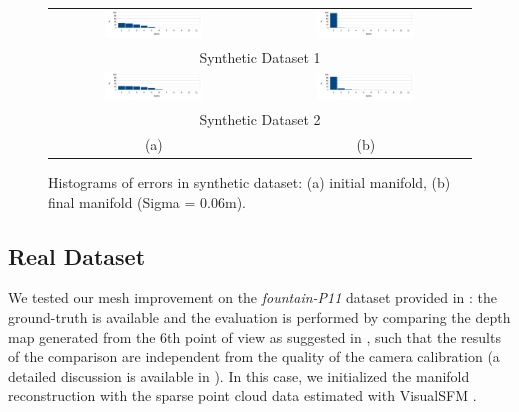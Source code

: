 \begin{figure}[t]
\setlength{\tabcolsep}{1px}
\centering
\begin{tabular}{cc}
\includegraphics[width=0.49\textwidth]{./img/synth1InitHist}&
\includegraphics[width=0.49\textwidth]{./img/synth1ResHist}\\
\multicolumn{2}{c}{Synthetic Dataset 1}\\
\includegraphics[width=0.49\textwidth]{./img/synth2InitHist}&
\includegraphics[width=0.49\textwidth]{./img/synth2ResHist}\\
\multicolumn{2}{c}{Synthetic Dataset 2}\\
(a) &
(b) \\
\end{tabular}
\caption{Histograms of errors in synthetic dataset: (a) initial manifold, (b) final manifold (Sigma = 0.06m).}
\label{fig:simulatedhist}
\end{figure}


\subsection{Real Dataset}
We tested our mesh improvement on the \emph{fountain-P11} dataset provided in \cite{strecha2008}: the ground-truth is available and the evaluation is performed by comparing the depth map generated from the 6th point of view as suggested in  \cite{strecha2008}, such that the results of the comparison are independent from the quality of the camera calibration (a detailed discussion is available in \cite{strecha2008}).
In this case, we initialized the manifold reconstruction with the sparse point cloud data estimated with VisualSFM \cite{wu2011visualsfm}. 


